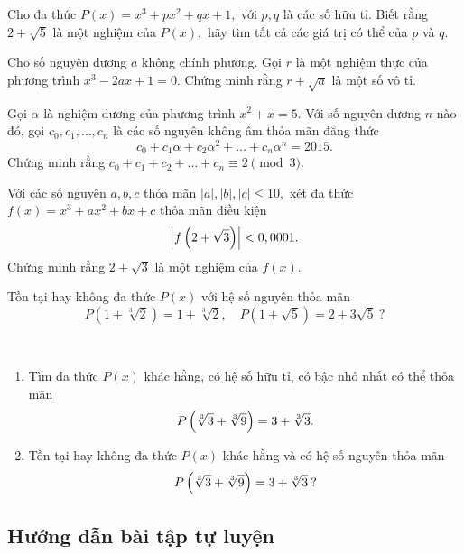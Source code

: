 \begin{btt}
Cho đa thức $P(x)=x^3+px^2+qx+1,$ với $p,q$ là các số hữu tỉ. Biết rằng $2+\sqrt{5}$ là một nghiệm của $P(x),$ hãy tìm tất cả các giá trị có thể của $p$ và $q.$
\end{btt}

\begin{btt}
Cho số nguyên dương $a$ không chính phương. Gọi $r$ là một nghiệm thực của phương trình $x^3-2ax+1=0.$ Chứng minh rằng $r+\sqrt{a}$ là một số vô tỉ.
\end{btt}

\begin{btt}
Gọi $\alpha $ là nghiệm dương của phương trình $x^2+x=5$. Với số nguyên dương $n$ nào đó, gọi $c_0,c_1,\ldots ,c_n$ là các số nguyên không âm thỏa mãn đẳng thức $$c_0+c_1\alpha +c_2\alpha ^2+\ldots+c_n\alpha^n=2015.$$
Chứng minh rằng ${{c}_{0}}+{{c}_{1}}+{{c}_{2}}+\ldots+{{c}_{n}}\equiv 2\pmod{3}.$
\end{btt}

\begin{btt}
Với các số nguyên $a, b, c$ thỏa mãn $|a|,|b|,|c|\le 10,$ xét đa thức $f(x)=x^3+ax^2+bx+c$ thỏa mãn điều kiện
$$
\left|f\left(\displaystyle 2+\sqrt{3} \right)\right|<0,0001.
$$
Chứng minh rằng $2+\sqrt{3}$ là một nghiệm của $f(x).$
\end{btt}

\begin{btt}
Tồn tại hay không đa thức $P(x)$ với hệ số nguyên thỏa mãn $$P\left(1+\sqrt[3]{2}\right)=1+\sqrt[3]{2},\quad P\left(1+\sqrt{5}\right)=2+3\sqrt{5}\:?$$ 
\end{btt}

\begin{btt} \
\begin{enumerate}[a,]
    \item Tìm đa thức $P(x)$ khác hằng, có hệ số hữu tỉ, có bậc nhỏ nhất có thể thỏa mãn $$P\left(\displaystyle \sqrt[3]{3}+\sqrt[3]{9} \right)=3+\sqrt[3]{3}.$$
    \item Tồn tại hay không đa thức $P(x)$ khác hằng và có hệ số nguyên thỏa mãn $$P\left(\displaystyle \sqrt[3]{3}+\sqrt[3]{9} \right)=3+\sqrt[3]{3} \: ?$$
\end{enumerate}
\end{btt}

\subsection*{Hướng dẫn bài tập tự luyện}

